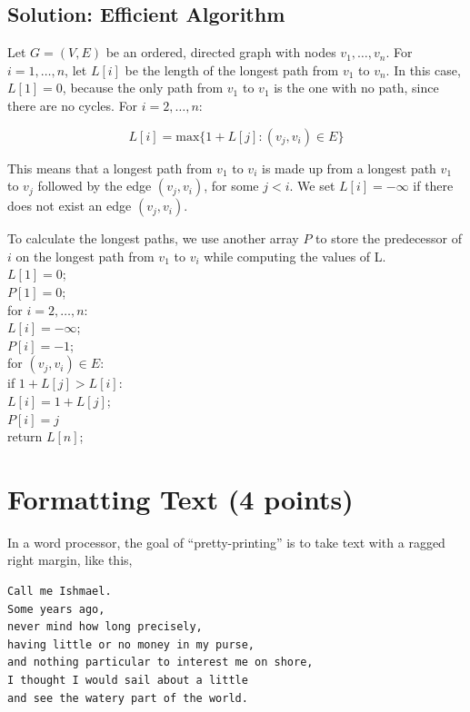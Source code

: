 \documentclass[letter,11pt]{article}
\begin{document}
\subsection{Solution: Efficient Algorithm}

Let $G=(V,E)$ be an ordered, directed graph with nodes $v_1,\dots,v_n$. For $i = 1, \dots, n$, let $L[i]$ be the length of the longest path from $v_1$ to $v_n$. In this case, $L[1] = 0$, because the only path from $v_1$ to $v_1$ is the one with no path, since there are no cycles. For $i = 2, \dots, n$:

\[L[i] = \text{max}\{1 + L[j] : (v_j,v_i) \in E \}\]

This means that a longest path from $v_1$ to $v_i$ is made up from a longest path $v_1$ to $v_j$ followed by the edge $(v_j, v_i)$, for some $j < i$. We set $L[i] = -\infty$ if there does not exist an edge $(v_j, v_i)$.

To calculate the longest paths, we use another array $P$ to store the predecessor of $i$ on the longest path from $v_1$ to $v_i$ while computing the values of L.\\

\noindent $L[1] = 0$;\\
$P[1] = 0$;\\
for $i = 2, \dots, n$: \\
\indent $L[i] = -\infty$;\\
\indent $P[i] = -1$;\\
\indent for $(v_j, v_i) \in E$:\\
\indent \indent if $1 + L[j] > L[i]$:\\
\indent \indent \indent $L[i] = 1 + L[j]$;\\
\indent \indent \indent $P[i] = j$\\
return $L[n]$;









\section{Formatting Text (4 points)}

In a word processor, the goal of ``pretty-printing'' is to take text with a ragged right margin, like this,

\begin{verbatim}
Call me Ishmael.
Some years ago,
never mind how long precisely,
having little or no money in my purse,
and nothing particular to interest me on shore,
I thought I would sail about a little
and see the watery part of the world.
\end{verbatim}
\end{document}
